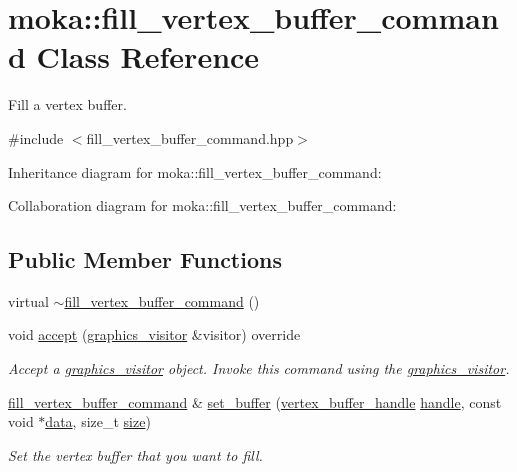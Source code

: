 \hypertarget{classmoka_1_1fill__vertex__buffer__command}{}\section{moka\+::fill\+\_\+vertex\+\_\+buffer\+\_\+command Class Reference}
\label{classmoka_1_1fill__vertex__buffer__command}


Fill a vertex buffer.  




{\ttfamily \#include $<$fill\+\_\+vertex\+\_\+buffer\+\_\+command.\+hpp$>$}



Inheritance diagram for moka\+::fill\+\_\+vertex\+\_\+buffer\+\_\+command\+:


Collaboration diagram for moka\+::fill\+\_\+vertex\+\_\+buffer\+\_\+command\+:
\subsection*{Public Member Functions}
\begin{DoxyCompactItemize}
\item 
virtual \mbox{\hyperlink{classmoka_1_1fill__vertex__buffer__command_a6ebbeb058ca33317cb889a5dbbf08254}{$\sim$fill\+\_\+vertex\+\_\+buffer\+\_\+command}} ()
\item 
void \mbox{\hyperlink{classmoka_1_1fill__vertex__buffer__command_a9e916e2371a2a165e1450f635dd534a9}{accept}} (\mbox{\hyperlink{classmoka_1_1graphics__visitor}{graphics\+\_\+visitor}} \&visitor) override
\begin{DoxyCompactList}\small\item\em Accept a \mbox{\hyperlink{classmoka_1_1graphics__visitor}{graphics\+\_\+visitor}} object. Invoke this command using the \mbox{\hyperlink{classmoka_1_1graphics__visitor}{graphics\+\_\+visitor}}. \end{DoxyCompactList}\item 
\mbox{\hyperlink{classmoka_1_1fill__vertex__buffer__command}{fill\+\_\+vertex\+\_\+buffer\+\_\+command}} \& \mbox{\hyperlink{classmoka_1_1fill__vertex__buffer__command_ace6582db2bd3043670696ea887fd31a6}{set\+\_\+buffer}} (\mbox{\hyperlink{structmoka_1_1vertex__buffer__handle}{vertex\+\_\+buffer\+\_\+handle}} \mbox{\hyperlink{classmoka_1_1fill__vertex__buffer__command_abcd9d3ffd197da205234e7d8a6029224}{handle}}, const void $\ast$\mbox{\hyperlink{classmoka_1_1fill__vertex__buffer__command_a7e10e74586aa6b3584162d10d0f3d58e}{data}}, size\+\_\+t \mbox{\hyperlink{classmoka_1_1fill__vertex__buffer__command_acae9b5478cb4c11d7206d82d94246aa3}{size}})
\begin{DoxyCompactList}\small\item\em Set the vertex buffer that you want to fill. \end{DoxyCompactList}\end{DoxyCompactItemize}
